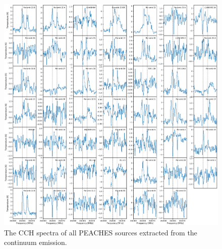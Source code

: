\documentclass[twocolumn]{aastex62}
\begin{document}
\begin{figure}[htbp!]
  \centering
  \includegraphics[width=\textwidth]{all_cch.pdf}
  \caption{The CCH spectra of all PEACHES sources extracted from the continuum emission.}
  \label{fig:all_cch}
\end{figure}




\end{document}
